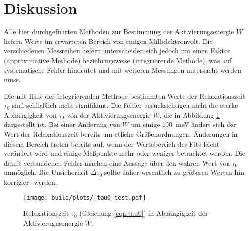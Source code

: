 \newpage
\section{Diskussion}
\label{sec:diskussion}
Alle hier durchgeführten Methoden zur Bestimmung der Aktivierungsenergie $W$
liefern Werte im erwarteten Bereich von einigen Millielektronvolt.
Die verschiedenen Messreihen liefern unterscheiden sich jedoch um einen Faktor
 (approximative Methode) beziehungsweise
 (integrierende Methode), was
auf systematische Fehler hindeutet und mit weiteren Messungen untersucht
werden muss.

Die mit Hilfe der integrierenden Methode bestimmten Werte der Relaxationszeit
$\tau_0$ sind schließlich nicht signifikant.
Die Fehler berücksichtigen nicht die starke Abhängigkeit von $\tau_0$ von der
Aktivierungsenergie $W$, die in Abbildung \ref{fig:_tau_test} dargestellt ist.
Bei einer Änderung von $W$ um einige \SI{100}{\milli\electronvolt} ändert
sich der Wert der Relaxationszeit bereits um etliche Größenordnungen.
Änderungen in diesem Bereich treten bereits auf, wenn der Wertebereich des Fits
leicht verändert wird und einige Meßpunkte mehr oder weniger betrachtet werden.
Die damit verbundenen Fehler machen eine Aussage über den wahren Wert von
$\tau_0$ unmöglich.
Die Unsicherheit $\Delta\tau_0$ sollte daher wesentlich zu größeren Werten hin
korrigiert werden.
\begin{figure}
    \centering
    \texttt{[image: build/plots/\_tau0\_test.pdf]}
    \caption{Relaxationszeit $\tau_0$ (Gleichung \ref{eqn:tau0}) in Abhängigkeit der Aktivierugnsenergie $W$.}
    \label{fig:_tau_test}
\end{figure}
